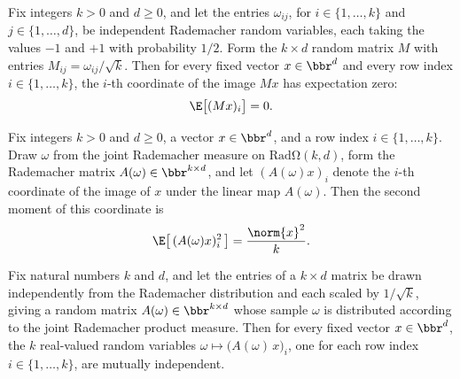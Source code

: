 \begin{lemma}
\label{integral_row_proj}
\leanok
{}
Fix integers $k > 0$ and $d \ge 0$, and let the entries $\omega_{ij}$, for $i \in
\{1,\dots,k\}$ and $j \in \{1,\dots,d\}$, be independent Rademacher random variables,
each taking the values $-1$ and $+1$ with probability $1/2$. Form the $k \times d$
random matrix $M$ with entries $M_{ij} = \omega_{ij}/\sqrt{k}$. Then for every fixed
vector $x \in \bbr^d$ and every row index $i \in \{1,\dots,k\}$, the $i$-th coordinate
of the image $Mx$ has expectation zero:
\[
\E\bigl[(Mx)_i\bigr] = 0.
\]
\end{lemma}

\begin{lemma}
\label{integral_sq_row_proj}
\leanok
{}
Fix integers $k > 0$ and $d \ge 0$, a vector $x \in \bbr^d$, and a row index $i \in \{1,
\dots, k\}$. Draw $\omega$ from the joint Rademacher measure on
$\mathrm{Rad\Omega}(k,d)$, form the Rademacher matrix $A(\omega) \in \bbr^{k \times d}$,
and let $(A(\omega)x)_i$ denote the $i$-th coordinate of the image of $x$ under the
linear map $A(\omega)$. Then the second moment of this coordinate is
\[
  \E\bigl[\,(A(\omega)x)_i^2\,\bigr] = \frac{\norm{x}^2}{k}.
\]
\end{lemma}

\begin{lemma}
\label{radMatrix_proj_indep}
\leanok
{}
Fix natural numbers $k$ and $d$, and let the entries of a $k \times d$ matrix be drawn
independently from the Rademacher distribution and each scaled by $1/\sqrt{k}$, giving a
random matrix $A(\omega) \in \bbr^{k \times d}$ whose sample $\omega$ is distributed
according to the joint Rademacher product measure. Then for every fixed vector $x \in
\bbr^{d}$, the $k$ real-valued random variables $\omega \mapsto
\bigl(A(\omega)\,x\bigr)_i$, one for each row index $i \in \{1,\dots,k\}$, are mutually
independent.
\end{lemma}

